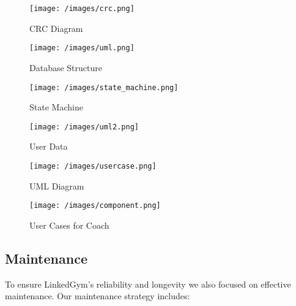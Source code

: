 \begin{figure}[H]
    \centering
    \texttt{[image: /images/crc.png]}
    \caption{CRC Diagram}
    \label{fig:example_image}
  \end{figure}


\begin{figure}[H]
    \centering
    \texttt{[image: /images/uml.png]}
    \caption{Database Structure}
    \label{fig:example_image}
  \end{figure}

\begin{figure}[H]
    \centering
    \texttt{[image: /images/state\_machine.png]}
    \caption{State Machine}
    \label{fig:example_image}
  \end{figure}

 \begin{figure}[H]
    \centering
    \texttt{[image: /images/uml2.png]}
    \caption{ User Data }
    \label{fig:example_image}
  \end{figure}

   \begin{figure}[H]
    \centering
    \texttt{[image: /images/usercase.png]}
    \caption{ UML Diagram }
    \label{fig:example_image}
  \end{figure}

  \begin{figure}[H]
    \centering
    \texttt{[image: /images/component.png]}
    \caption{ User Cases for Coach }
    \label{fig:example_image}
  \end{figure}



\subsection{Maintenance}
To ensure LinkedGym's reliability and longevity we also focused on effective maintenance. Our maintenance strategy includes:

